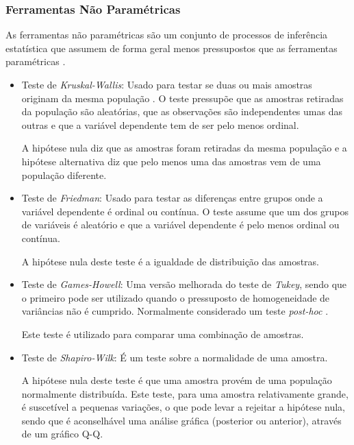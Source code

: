 \documentclass[conference]{IEEEtran}
\begin{document}
\subsubsection{Ferramentas Não Paramétricas}

As ferramentas não paramétricas são um conjunto de processos de inferência estatística que assumem de forma geral menos pressupostos que as ferramentas paramétricas \cite{Vaart_2007}.

\begin{itemize}
    \item Teste de \textit{Kruskal-Wallis}: Usado para testar se duas ou mais amostras originam da mesma população \cite{Kruskal_Wallis_1952}. O teste pressupõe que as amostras retiradas da população são aleatórias, que as observações são independentes umas das outras e que a variável dependente tem de ser pelo menos ordinal.

A hipótese nula diz que as amostras foram retiradas da mesma população e a hipótese alternativa diz que pelo menos uma das amostras vem de uma população diferente.

    \item Teste de \textit{Friedman}: Usado para testar as diferenças entre grupos onde a variável dependente é ordinal ou contínua. O teste assume que um dos grupos de variáveis é aleatório e que a variável dependente é pelo menos ordinal ou contínua.

A hipótese nula deste teste é a igualdade de distribuição  das amostras.
        
    \item Teste de \textit{Games-Howell}: Uma versão melhorada do teste de \textit{Tukey}, sendo que o primeiro pode ser utilizado quando o pressuposto de homogeneidade de variâncias não é cumprido. Normalmente considerado um teste \textit{post-hoc} \cite{Lee2020}.

Este teste é utilizado para comparar uma combinação de amostras.
        
    \item Teste de \textit{Shapiro-Wilk}: É um teste sobre a normalidade de uma amostra.

A hipótese nula deste teste é que uma amostra provém de uma população normalmente distribuída. Este teste, para uma amostra relativamente grande, é suscetível a pequenas variações, o que pode levar a rejeitar a hipótese nula, sendo que é aconselhável uma análise gráfica (posterior ou anterior), através de um gráfico Q-Q.

\end{itemize}
\end{document}
